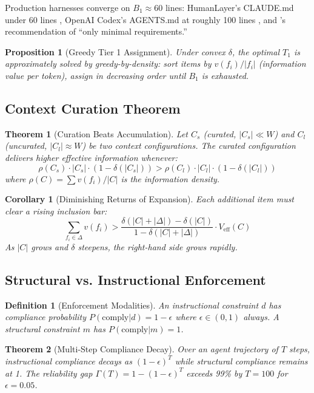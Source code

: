 \documentclass[11pt, a4paper, copyright]{googledeepmind}
\newtheorem{definition}{Definition}[section]
\newtheorem{theorem}{Theorem}[section]
\newtheorem{proposition}{Proposition}[section]
\newtheorem{corollary}{Corollary}[section]
\begin{document}
Production harnesses converge on $B_1 \approx 60$ lines: HumanLayer's CLAUDE.md under 60 lines \citep{humanlayer2025skillissue}, OpenAI Codex's AGENTS.md at roughly 100 lines \citep{openai2025codex}, and \citet{gloaguen2026agents}'s recommendation of ``only minimal requirements.''

\begin{proposition}[Greedy Tier 1 Assignment]
Under convex $\delta$, the optimal $T_1$ is approximately solved by greedy-by-density: sort items by $v(f_i)/|f_i|$ (information value per token), assign in decreasing order until $B_1$ is exhausted.
\end{proposition}

\subsection{Context Curation Theorem}

\begin{theorem}[Curation Beats Accumulation]
\label{thm:curation}
Let $C_s$ (curated, $|C_s| \ll W$) and $C_l$ (uncurated, $|C_l| \approx W$) be two context configurations. The curated configuration delivers higher effective information whenever:
$$\rho(C_s) \cdot |C_s| \cdot (1 - \delta(|C_s|)) > \rho(C_l) \cdot |C_l| \cdot (1 - \delta(|C_l|))$$
where $\rho(C) = \sum v(f_i) / |C|$ is the information density.
\end{theorem}

\begin{corollary}[Diminishing Returns of Expansion]
Each additional item must clear a rising inclusion bar:
$$\sum_{f_i \in \Delta} v(f_i) > \frac{\delta(|C| + |\Delta|) - \delta(|C|)}{1 - \delta(|C| + |\Delta|)} \cdot V_{\text{eff}}(C)$$
As $|C|$ grows and $\delta$ steepens, the right-hand side grows rapidly.
\end{corollary}

\subsection{Structural vs. Instructional Enforcement}

\begin{definition}[Enforcement Modalities]
An \emph{instructional constraint} $d$ has compliance probability $P(\text{comply}|d) = 1 - \epsilon$ where $\epsilon \in (0,1)$ always. A \emph{structural constraint} $m$ has $P(\text{comply}|m) = 1$.
\end{definition}

\begin{theorem}[Multi-Step Compliance Decay]
\label{thm:compliance}
Over an agent trajectory of $T$ steps, instructional compliance decays as $(1-\epsilon)^T$ while structural compliance remains at 1. The reliability gap $\Gamma(T) = 1 - (1-\epsilon)^T$ exceeds 99\% by $T = 100$ for $\epsilon = 0.05$.
\end{theorem}
\end{document}
